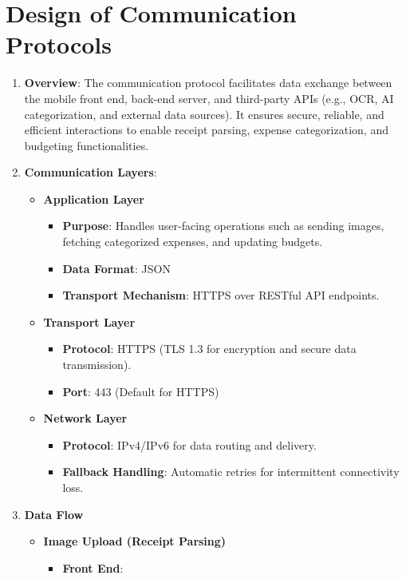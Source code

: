 \documentclass[12pt, titlepage]{article}
\begin{document}
\section{Design of Communication Protocols}

\begin{enumerate}
	\item \textbf{Overview}: The communication protocol facilitates data exchange between the mobile front end, back-end server, and third-party APIs (e.g., OCR, AI categorization, and external data sources). It ensures secure, reliable, and efficient interactions to enable receipt parsing, expense categorization, and budgeting functionalities.
	\item \textbf{Communication Layers}:
	\begin{itemize}
		\item \textbf{Application Layer}
		\begin{itemize}
			\item \textbf{Purpose}: Handles user-facing operations such as sending images, fetching categorized expenses, and updating budgets.
			\item \textbf{Data Format}: JSON
			\item \textbf{Transport Mechanism}: HTTPS over RESTful API endpoints.
		\end{itemize}
		\item \textbf{Transport Layer}
		\begin{itemize}
			\item \textbf{Protocol}: HTTPS (TLS 1.3 for encryption and secure data transmission).
			\item \textbf{Port}: 443 (Default for HTTPS)
		\end{itemize}
		\item \textbf{Network Layer}
		\begin{itemize}
			\item \textbf{Protocol}: IPv4/IPv6 for data routing and delivery.
			\item \textbf{Fallback Handling}: Automatic retries for intermittent connectivity loss.
		\end{itemize}
	\end{itemize}
	\item \textbf{Data Flow}
	\begin{itemize}
		\item \textbf{Image Upload (Receipt Parsing)}
		\begin{itemize}
			\item \textbf{Front End}:
			\begin{itemize}

\end{itemize}
\end{itemize}
\end{itemize}
\end{enumerate}
\end{document}
